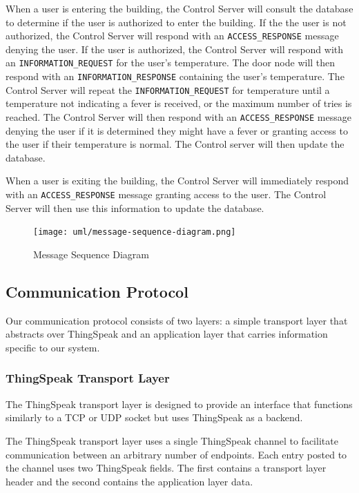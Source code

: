 When a user is entering the building, the Control Server will consult the
database to determine if the user is authorized to enter the building.  If the
the user is not authorized, the Control Server will respond with an
\verb|ACCESS_RESPONSE| message denying the user.  If the user is authorized, the
Control Server will respond with an \verb|INFORMATION_REQUEST| for the user's
temperature.  The door node will then respond with an \verb|INFORMATION_RESPONSE|
containing the user's temperature.  The Control Server will repeat the
\verb|INFORMATION_REQUEST| for temperature until a temperature not indicating a fever
is received, or the maximum number of tries is reached.  The Control Server
will then respond with an \verb|ACCESS_RESPONSE| message denying the user if it is
determined they might have a fever or granting access to the user if their
temperature is normal.  The Control server will then update the database.

When a user is exiting the building, the Control Server will immediately respond
with an \verb|ACCESS_RESPONSE| message granting access to the user.  The Control
Server will then use this information to update the database.

\begin{figure}[!htb]
\centering
\texttt{[image: uml/message-sequence-diagram.png]}
\caption{Message Sequence Diagram}
\label{fig:message-sequence-diagram}
\end{figure}

\subsection{Communication Protocol}
\label{subsec:communication-protocol}

Our communication protocol consists of two layers: a simple transport layer that
abstracts over ThingSpeak and an application layer that carries information
specific to our system.

\subsubsection{ThingSpeak Transport Layer}

The ThingSpeak transport layer is designed to provide an interface that
functions similarly to a TCP or UDP socket but uses ThingSpeak as a backend.

The ThingSpeak transport layer uses a single ThingSpeak channel to facilitate
communication between an arbitrary number of endpoints. Each entry posted to the
channel uses two ThingSpeak fields. The first contains a transport layer header
and the second contains the application layer data.

